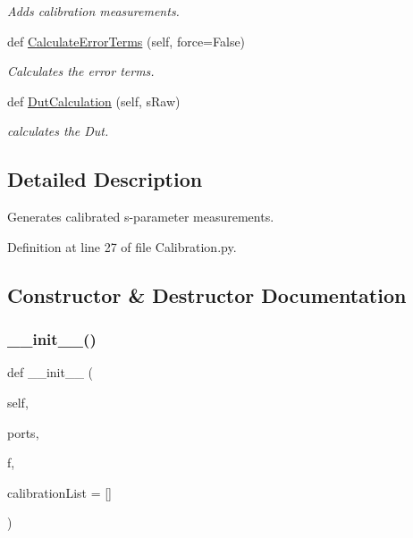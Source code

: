 \begin{DoxyCompactItemize}
\begin{DoxyCompactList}\small\item\em Adds calibration measurements. \end{DoxyCompactList}\item 
def \hyperlink{classSignalIntegrity_1_1Measurement_1_1Calibration_1_1Calibration_1_1Calibration_a97348b9e4c449174b1e735563e3a8a9c}{Calculate\+Error\+Terms} (self, force=False)
\begin{DoxyCompactList}\small\item\em Calculates the error terms. \end{DoxyCompactList}\item 
def \hyperlink{classSignalIntegrity_1_1Measurement_1_1Calibration_1_1Calibration_1_1Calibration_ac257ff0d436f9c02507349f82ece9e56}{Dut\+Calculation} (self, s\+Raw)
\begin{DoxyCompactList}\small\item\em calculates the Dut. \end{DoxyCompactList}\end{DoxyCompactItemize}


\subsection{Detailed Description}
Generates calibrated s-\/parameter measurements. 

Definition at line 27 of file Calibration.\+py.



\subsection{Constructor \& Destructor Documentation}
\mbox{\label{classSignalIntegrity_1_1Measurement_1_1Calibration_1_1Calibration_1_1Calibration_a09488d31cef60d14cb3ebfe3f29b963b}} 
\subsubsection{\texorpdfstring{\+\_\+\+\_\+init\+\_\+\+\_\+()}{\_\_init\_\_()}}
{\footnotesize\ttfamily def \+\_\+\+\_\+init\+\_\+\+\_\+ (\begin{DoxyParamCaption}\item[{}]{self,  }\item[{}]{ports,  }\item[{}]{f,  }\item[{}]{calibration\+List = {\ttfamily \mbox{[}\mbox{]}} }\end{DoxyParamCaption})}



